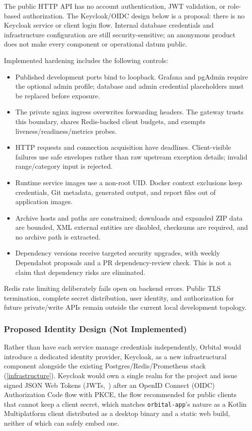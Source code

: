 \documentclass{scrartcl}
\begin{document}
The public HTTP API has no account authentication, JWT validation, or role-based authorization.
The Keycloak/OIDC design below is a proposal: there is no Keycloak service or client login flow.
Internal database credentials and infrastructure configuration are still security-sensitive;
an anonymous product does not make every component or operational datum public.

Implemented hardening includes the following controls:
\begin{itemize}
  \item Published development ports bind to loopback. Grafana and pgAdmin require the optional
  admin profile; database and admin credential placeholders must be replaced before exposure.
  \item The private nginx ingress overwrites forwarding headers. The gateway trusts this
  boundary, shares Redis-backed client budgets, and exempts liveness/readiness/metrics probes.
  \item HTTP requests and connection acquisition have deadlines. Client-visible failures use safe
  envelopes rather than raw upstream exception details; invalid range/category input is rejected.
  \item Runtime service images use a non-root UID. Docker context exclusions keep credentials,
  Git metadata, generated output, and report files out of application images.
  \item Archive hosts and paths are constrained; downloads and expanded ZIP data are bounded,
  XML external entities are disabled, checksums are required, and no archive path is extracted.
  \item Dependency versions receive targeted security upgrades, with weekly Dependabot proposals
  and a PR dependency-review check. This is not a claim that dependency risks are eliminated.
\end{itemize}

Redis rate limiting deliberately fails open on backend errors. Public TLS termination, complete
secret distribution, user identity, and authorization for future private/write APIs remain outside
the current local development topology.

\subsubsection{Proposed Identity Design (Not Implemented)}\label{security-identity}

Rather than have each service manage credentials independently, Orbital would introduce a
dedicated identity provider, Keycloak, as a new infrastructural component alongside the existing
Postgres/Redis/Prometheus stack (\cref{infrastructure}). Keycloak would own a single realm for
the project and issue signed JSON Web Tokens (JWTs,~\citep{jones2015jwt}) after an OpenID Connect
(OIDC)~\citep{sakimura2014oidc} Authorization Code flow with PKCE, the flow recommended for
public clients that cannot keep a client secret, which matches \texttt{orbital-app}'s nature as a
Kotlin Multiplatform client distributed as a desktop binary and a static web build, neither of
which can safely embed one.
\end{document}
